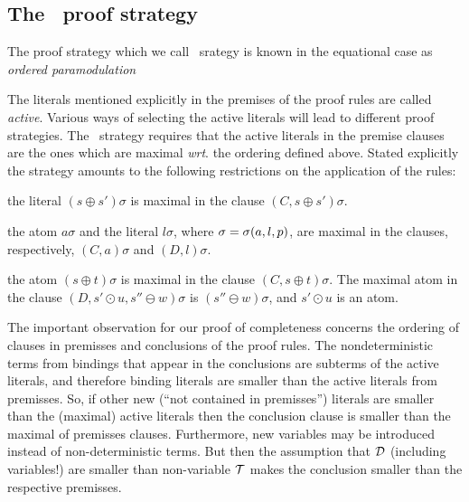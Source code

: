 \subsection {The \strategy\ proof strategy} \label {se:strategy}

The proof strategy
which we call \strategy\ srategy 
is known in the equational case as {\em ordered
paramodulation} 
%
 
The literals mentioned explicitly in the premises of the proof rules are
called {\em active}. Various ways of selecting the active literals will lead
to different proof strategies. The \strategy\ strategy requires that the
active literals in the premise clauses are the ones which are maximal {\it
wrt}. the ordering defined above.  Stated explicitly the strategy amounts to
the following restrictions on the application of the rules:
\begin{description}\smallerspaces
\item[Reflexivity resolution:] the literal \((s\oplus s')\sigma\) is maximal
in the clause \((C,s\oplus s')\sigma\).
\item [Superposition:] the atom \(a\sigma\) and the literal \(l\sigma\),
where \(\sigma=\sigma(a,l,p)\), are maximal in the clauses, respectively,
\((C,a)\sigma\) and \((D,l)\sigma\).
\item [Compositionality resolution:] the atom \((s\oplus t)\sigma\) is maximal
in the clause \((C,s\oplus t )\sigma\). The maximal atom in the clause
\((D, s'\odot u, s''\ominus w)\sigma\) is \((s''\ominus w)\sigma\), and
\(s'\odot u\) is an atom.
\end{description}

The important observation for our proof of completeness concerns the ordering of
clauses in premisses and conclusions of the proof rules.  The
nondeterministic terms from bindings that appear in the conclusions are subterms
of the active literals, and therefore binding literals are smaller than
the active literals from premisses.  So, if other new (``not contained
in premisses'') literals are smaller than the (maximal) active literals
then the conclusion clause is smaller than the maximal of premisses clauses.
Furthermore, new variables may be introduced instead of non-deterministic terms.
But then the assumption that ${\cal D}$ (including variables!) 
are smaller than non-variable ${\cal T}$ makes the conclusion smaller than the 
respective premisses.

